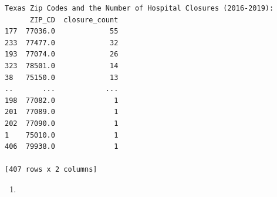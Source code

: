 \documentclass[
  letterpaper,
  DIV=11,
  numbers=noendperiod]{scrartcl}
\providecommand{\tightlist}{%
  \setlength{\itemsep}{0pt}\setlength{\parskip}{0pt}}\usepackage{longtable,booktabs,array}
\begin{document}
\begin{verbatim}
Texas Zip Codes and the Number of Hospital Closures (2016-2019):
      ZIP_CD  closure_count
177  77036.0             55
233  77477.0             32
193  77074.0             26
323  78501.0             14
38   75150.0             13
..       ...            ...
198  77082.0              1
201  77089.0              1
202  77090.0              1
1    75010.0              1
406  79938.0              1

[407 rows x 2 columns]
\end{verbatim}

\begin{enumerate}
\def\labelenumi{\arabic{enumi}.}
\setcounter{enumi}{1}
\tightlist
\item
\end{enumerate}
\end{document}
